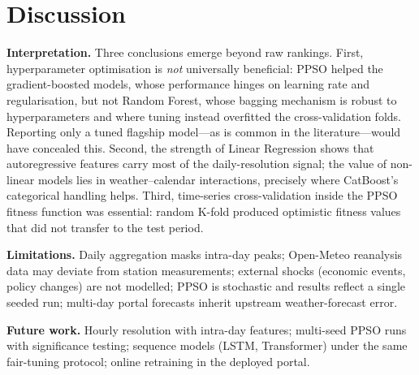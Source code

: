 \section{Discussion}\label{sec:discussion}

\textbf{Interpretation.} Three conclusions emerge beyond raw rankings. First, hyperparameter optimisation is \emph{not} universally beneficial: PPSO helped the gradient-boosted models, whose performance hinges on learning rate and regularisation, but not Random Forest, whose bagging mechanism is robust to hyperparameters and where tuning instead overfitted the cross-validation folds. Reporting only a tuned flagship model---as is common in the literature---would have concealed this. Second, the strength of Linear Regression shows that autoregressive features carry most of the daily-resolution signal; the value of non-linear models lies in weather--calendar interactions, precisely where CatBoost's categorical handling helps. Third, time-series cross-validation inside the PPSO fitness function was essential: random K-fold produced optimistic fitness values that did not transfer to the test period.

\textbf{Limitations.} Daily aggregation masks intra-day peaks; Open-Meteo reanalysis data may deviate from station measurements; external shocks (economic events, policy changes) are not modelled; PPSO is stochastic and results reflect a single seeded run; multi-day portal forecasts inherit upstream weather-forecast error.

\textbf{Future work.} Hourly resolution with intra-day features; multi-seed PPSO runs with significance testing; sequence models (LSTM, Transformer) under the same fair-tuning protocol; online retraining in the deployed portal.
